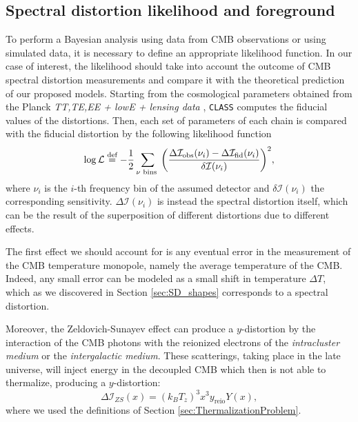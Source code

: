 \subsection{Spectral distortion likelihood and foreground}
To perform a Bayesian analysis using data from CMB observations or using simulated data, it is necessary to define an appropriate likelihood function. In our case of interest, the likelihood should take into account the outcome of CMB spectral distortion measurements and compare it with the theoretical prediction of our proposed models. Starting from the cosmological parameters obtained from the Planck \emph{TT,TE,EE + lowE + lensing data} \cite{planck2018results}, \texttt{CLASS} computes the fiducial values of the distortions. Then, each set of parameters of each chain is compared with the fiducial distortion by the following likelihood function
\begin{equation}
    \log \mathcal L\stackrel{\text{def}}{=} -\frac12 \sum_{\nu \text{ bins }}\bigg(\frac{\Delta\mathcal I_\text{obs}(\nu_i)-\Delta\mathcal I_\text{fid}(\nu_i)}{\delta \mathcal I(\nu_i)}\bigg)^2,
\end{equation}
where $\nu_i$ is the $i$-th frequency bin of the assumed detector and $\delta \mathcal I(\nu_i)$ the corresponding sensitivity. $\Delta \mathcal I(\nu_i)$ is instead the spectral distortion itself, which can be the result of the superposition of different distortions due to different effects. 

The first effect we should account for is any eventual error in the measurement of the CMB temperature monopole, namely the average temperature of the CMB. Indeed, any small error can be modeled as a small shift in temperature $\Delta T$, which as we discovered in Section \ref{sec:SD_shapes} corresponds to a spectral distortion.

Moreover, the Zeldovich-Sunayev effect \cite{Zeldovich1972} can produce a $y$-distortion by the interaction of the CMB photons with the reionized electrons of the \emph{intracluster medium} or the \emph{intergalactic medium}. These scatterings, taking place in the late universe, will inject energy in the decoupled CMB which then is not able to thermalize, producing a $y$-distortion:
$$ \Delta \mathcal I_{ZS}(x)=(k_BT_z)^3x^3 y_\text{reio} Y(x),$$
where we used the definitions of Section \ref{sec:ThermalizationProblem}.

